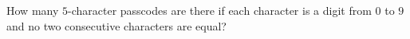 How many $5$-character passcodes are there if each character is a digit from $0$ to $9$ and no two consecutive characters are equal?
